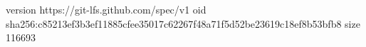 version https://git-lfs.github.com/spec/v1
oid sha256:c85213ef3b3ef11885cfee35017c62267f48a71f5d52be23619c18ef8b53bfb8
size 116693
